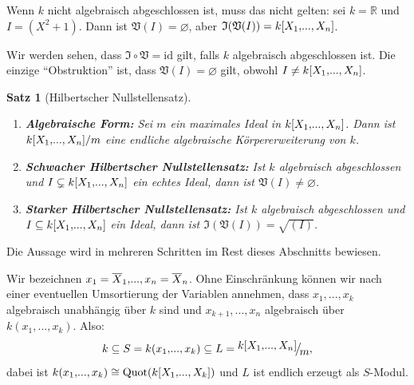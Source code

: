 \documentclass[a4paper,12pt]{scrbook}
\newtheorem{satz}{Satz}
\def\V{\mathfrak{V}}
\def\I{\mathfrak{I}}
\newcommand{\id}{\mathrm{id}}
\newcommand{\leer}{\ensuremath{\varnothing}}
\newcommand{\Quot}{\mathrm{Quot}}
\renewcommand{\dotsc}{\ensuremath{\!...}}
\newcommand{\set}[1]{\ensuremath{\mathbb{#1}}}
\newcommand{\R}{\set{R}}
\def\Bar#1{\ensuremath\overline{#1}}
\newcommand{\Quotient}[2]{
  \mathchoice
  { %
    \raisebox{0.7ex}{\ensuremath{#1}}
    \ensuremath{\mkern-3mu}\big/\ensuremath{\mkern-3mu}
    \raisebox{-0.6ex}{\ensuremath{#2}}
  }
  { %
    #1/#2
  }
  { %
    #1/#2
  }
  { %
    #1/#2
  }
}
\newcommand{\polyx}[1][n]{\ensuremath%
  [X_{1},\dotsc,X_{#1}]}
\begin{document}
\begin{nbsp}
  Wenn $k$ nicht algebraisch abgeschlossen ist, muss das nicht gelten: sei $k=\R$ und $I=(X^2+1)$. Dann ist $\V(I)=\leer$, aber
  $\I(\V(I)) = k\polyx$.
\end{nbsp}

Wir werden sehen, dass $\I\circ\V=\id$ gilt, falls $k$ algebraisch abgeschlossen ist. Die einzige \enquote{Obstruktion} ist,
dass $\V(I)=\leer$ gilt, obwohl $I\neq k\polyx$.

\begin{satz}[Hilbertscher Nullstellensatz]\label{satz2}\label{HNS}
  \begin{enumerate}
  \item{} {\bf Algebraische Form:} Sei $m$ ein maximales Ideal in $k\polyx$. Dann ist $\Quotient{k\polyx}{m}$ eine
    endliche algebraische Körpererweiterung von $k$.
  \item {\bf Schwacher Hilbertscher Nullstellensatz:} Ist $k$ algebraisch abgeschlossen und $I\subsetneq k\polyx$
    ein echtes Ideal, dann ist $\V(I)\neq\leer$.
  \item {\bf Starker Hilbertscher Nullstellensatz:} Ist $k$ algebraisch abgeschlossen und $I\subseteq k\polyx$ ein
    Ideal, dann ist $\I(\V(I))=\sqrt{(I)}$.
  \end{enumerate}
\end{satz}

Die Aussage wird in mehreren Schritten im Rest dieses Abschnitts bewiesen.

Wir bezeichnen $x_1=\Bar{X}_1,\dotsc,x_n=\Bar{X}_n$. Ohne Einschränkung können wir nach einer eventuellen Umsortierung
der Variablen annehmen, dass $x_1,\dotsc,x_k$ algebraisch unabhängig über $k$ sind und $x_{k+1},\dotsc,x_n$ algebraisch über
$k(x_1,\dotsc,x_k)$. Also:
\[ k \subseteq S = k(x_1,\dotsc,x_k) \subseteq L=\Quotient{k\polyx}{m}, \]
dabei ist $k(x_1,\dotsc,x_k)\cong\Quot(k\polyx[k])$ und $L$ ist endlich erzeugt als $S$-Modul.
\end{document}
